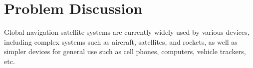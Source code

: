 %
%
%
%
%

%
%
%
%
%


\chapter{Problem Discussion} \label{ch:problem-discussion}






Global navigation satellite systems are currently widely used by various devices, including complex systems such as aircraft, satellites, and rockets, as well as simpler devices for general use such as cell phones, computers, vehicle trackers, etc.

